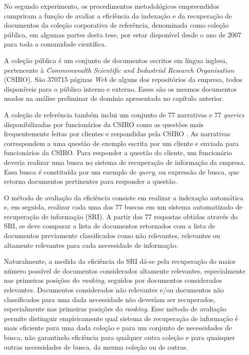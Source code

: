 No segundo experimento, os procedimentos metodológicos empreendidos cumpriram a função de avaliar a eficiência da indexação e da recuperação de documentos da coleção corporativa de referência, denominada como coleção pública, em algumas partes desta tese, por estar disponível desde o ano de 2007 para toda a comunidade científica. 

A coleção pública é um conjunto de documentos escritos em língua inglesa, pertencente à \textit{Commonwealth Scientific and Industrial Research Organisation} (CSIRO). São 370715 páginas \textit{Web} de alguns dos repositórios da empresa, todos disponíveis para o público interno e externo. Esses são os mesmos documentos usados na análise preliminar de domínio apresentada no capítulo anterior. 

A coleção de referência também inclui um conjunto de 77 narrativas e 77 \textit{queries} disponibilizadas por funcionários da CSIRO como as questões mais frequentemente feitas por clientes e respondidas pela CSIRO \cite{bailey07csiro}. As narrativas correspondem a uma questão de exemplo escrita por um cliente e enviada para funcionários da CSIRO. Para responder a questão do cliente, um funcionário deveria realizar uma busca no sistema de recuperação de informação da empresa. Essa busca é constituída por um exemplo de \textit{query}, ou expressão de busca, que retorna documentos pertinentes para responder a questão.

O método de avaliação da eficiência consiste em realizar a indexação automática e, em seguida, realizar cada uma das 77 buscas em um sistema automatizado de recuperação de informação (SRI). A partir das 77 respostas obtidas através do SRI, se deve comparar a lista de documentos retornados com a lista de documentos previamente classificados como não relevantes, relevantes ou altamente relevantes para cada necessidade de informação.

Naturalmente, a medida da eficiência do SRI dá-se pela recuperação do maior número possível de documentos considerados altamente relevantes, especialmente nas primeiras posições do \textit{ranking}, seguidos por documentos considerados relevantes. Documentos considerados não relevantes e/ou documentos não classificados para uma dada necessidade não deveríam ser recuperados, especialmente nas primeiras posições do \textit{ranking}. Esse método de avaliação permite distinguir empiricamente qual sistema de recuperação de informação é mais eficiente para uma dada coleção e para um conjunto de necessidades de busca, não garantindo eficiência para qualquer outra coleção e para quaisquer outras necessidades de busca, da mesma coleção ou de outras.

